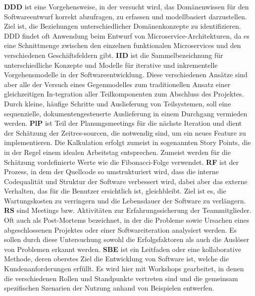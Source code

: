 \newline
\textbf{DDD} ist eine Vorgehensweise, in der versucht wird, das Domänenwissen für den Softwareentwurf korrekt abzufragen, zu erfassen und modellbasiert darzustellen. Ziel ist, die Beziehungen unterschiedlicher Domänenkonzepte zu identifizieren. 
DDD findet oft Anwendung beim Entwurf von Microservice-Architekturen, da es eine Schnittmenge zwischen den einzelnen funktionalen Microservices und den verschiedenen Geschäftsfeldern gibt.\cite{Rademacher2018-yo}
\newline
\textbf{IID} ist die Sammelbezeichnung für unterschiedliche Konzepte und Modelle für iterative und inkrementelle Vorgehensmodelle in der Softwareentwicklung. 
Diese verschiedenen Ansätze sind aber alle der Versuch eines Gegenmodelles zum traditionellen Ansatz einer gleichzeitigen In-tegration aller Teilkomponenten zum Abschluss des Projektes. 
Durch kleine, häufige Schritte und Auslieferung von Teilsystemen, soll eine sequenzielle, dokumentengesteuerte Auslieferung in einem Durchgang vermieden werden. \cite{Larman2003-fg}
\newline
\textbf{PlP}  ist Teil der Planungsmeetings für die nächste Iteration und dient der Schätzung der Zeitres-sourcen, die notwendig sind, um ein neues Feature zu implementieren. 
Die Kalkulation erfolgt zumeist in sogenannten Story Points, die in der Regel einem idealen Arbeitstag entsprechen. 
Zumeist werden für die Schätzung vordefinierte Werte wie die Fibonacci-Folge verwendet.
\cite{Mahnic2012-ve}
\newline
\textbf{RF} ist der Prozess, in dem der Quellcode so umstrukturiert wird, dass die interne Codequalität und Struktur der Software verbessert wird, dabei aber das externe Verhalten, das für die Benutzer ersichtlich ist, gleichbleibt. 
Ziel ist es, die Wartungskosten zu verringern und die Lebensdauer der Software zu verlängern.\cite{Kaur2019-wy}
\newline
\textbf{RS} sind Meetings bzw. Aktivitäten zur Erfahrungssicherung der Teammitglieder. 
Oft auch als Post-Mortems bezeichnet, in der die Probleme sowie Ursachen eines abgeschlossenen Projektes oder einer Softwareiteration analysiert werden. 
Es sollen durch diese Untersuchung sowohl die Erfolgsfaktoren als auch die Auslöser von Problemen erkannt werden.\cite{Lehtinen2014-ou}
\newline
\textbf{SBE} ist ein Leitfaden oder eine kollaborative Methode, deren oberstes Ziel die Entwicklung von Software ist, welche die Kundenanforderungen erfüllt. 
Es wird hier mit Workshops gearbeitet, in denen die verschiedenen Rollen und Standpunkte vertreten sind und die gemeinsam spezifischen Szenarien der Nutzung anhand von Beispielen entwerfen. 
